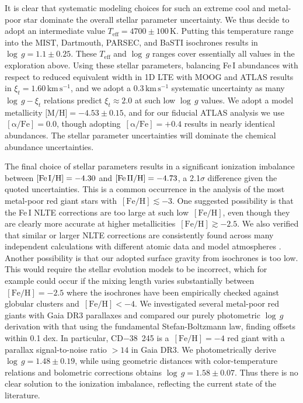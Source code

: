 \documentclass{natureprintstyle}
\newcommand{\unit}[1]{\ensuremath{\mathrm{\,#1}}\xspace}
\newcommand{\feh}{\unit{[Fe/H]}}
\newcommand{\teff}{\ensuremath{T_\mathrm{eff}}\xspace}
\newcommand{\Teff}{\teff}
\newcommand{\logg}{\ensuremath{\log\,g}\xspace}
\newcommand{\alphafe}{\unit{[\alpha/Fe]}}
\newcommand{\kms}{\unit{km\,s^{-1}}}
\newcommand{\cdstar}{CD$-$38~245\xspace}
\begin{document}
It is clear that systematic modeling choices for such an extreme cool and metal-poor star dominate the overall stellar parameter uncertainty.
We thus decide to adopt an intermediate value $\Teff=4700 \pm 100$\,K. Putting this temperature range into the MIST, Dartmouth, PARSEC, and BaSTI isochrones results in $\logg = 1.1 \pm 0.25$.
These $\Teff$ and $\logg$ ranges cover essentially all values in the exploration above.
Using these stellar parameters, balancing Fe\,I abundances with respect to reduced equivalent width in 1D LTE with MOOG and ATLAS results in $\xi_t = 1.60\kms$, and we adopt a 0.3\kms systematic uncertainty as many $\logg-\xi_t$ relations predict $\xi_t \approx 2.0$ at such low \logg values\cite{Ji2023}.
We adopt a model metallicity $\mbox{[M/H]} = -4.53 \pm 0.15$, and for our fiducial ATLAS analysis we use $\alphafe = 0.0$, though adopting $\alphafe = +0.4$ results in nearly identical abundances.
The stellar parameter uncertainties will dominate the chemical abundance uncertainties.

The final choice of stellar parameters results in a significant ionization imbalance between $\mbox{[Fe\,I/H]}=-4.30$ and $\mbox{[Fe\,II/H]}=-4.73$, a 2.1$\sigma$ difference given the quoted uncertainties.
This is a common occurrence in the analysis of the most metal-poor red giant stars with $\feh \lesssim -3$\cite{Karovicova2020,Martin2022,Caffau2025}.
One suggested possibility is that the Fe\,I NLTE corrections are too large at such low \feh\cite{Caffau2024,Caffau2025}, even though they are clearly more accurate at higher metallicities $\feh \gtrsim -2.5$\cite{Bergemann2017}.
We also verified that similar or larger NLTE corrections are consistently found across many independent calculations with different atomic data and model atmospheres \cite{Bergemann2012b,Lind2012,Mashonkina2017,Ezzeddine2018}.
Another possibility is that our adopted surface gravity from isochrones is too low. This would require the stellar evolution models to be incorrect, which for example could occur if the mixing length varies substantially between $\feh = -2.5$ where the isochrones have been empirically checked against globular clusters and $\feh < -4$\cite{Tayar2017,Choi2018}. We investigated several metal-poor red giants with Gaia DR3 parallaxes and compared our purely photometric \logg derivation with that using the fundamental Stefan-Boltzmann law, finding offsets within 0.1 dex. In particular, \cdstar is a $\feh=-4$ red giant with a parallax signal-to-noise ratio ${>}14$ in Gaia DR3. We photometrically derive $\logg = 1.48 \pm 0.19$, while using geometric distances\cite{bai21} with color-temperature relations\cite{Mucciarelli2021} and bolometric corrections\cite{Casagrande2018} obtains $\logg = 1.58 \pm 0.07$.
Thus there is no clear solution to the ionization imbalance, reflecting the current state of the literature.
\end{document}
